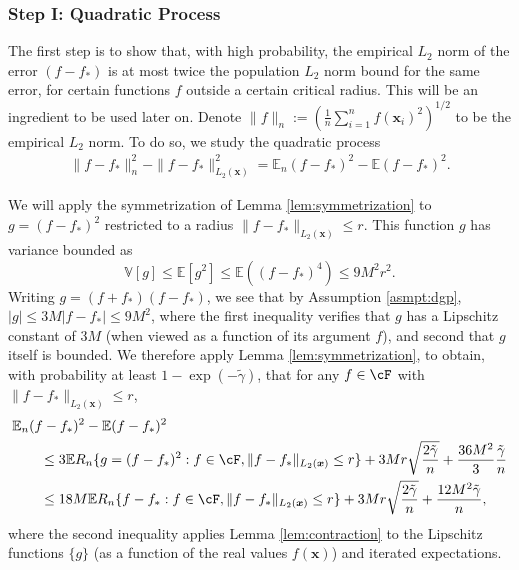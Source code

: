 \documentclass[11pt]{article}
\numberwithin{equation}{section}
\theoremstyle{definition}
\newcommand{\E}{\mathbb{E}}
\newcommand{\V}{\mathbb{V}}
\newcommand{\bx}{\bm{x}}
\newcommand{\gt}{\tilde{\gamma}}
\begin{document}
\begin{appendices}
\subsubsection{Step I: Quadratic Process} 
	\label{appx:quadratic}

The first step is to show that, with high probability, the empirical $L_2$ norm of the error $(f - f_*)$ is at most twice the population $L_2$ norm bound for the same error, for certain functions $f$ outside a certain critical radius. This will be an ingredient to be used later on. Denote $\| f \|_n := \left( \frac{1}{n} \sum_{i=1}^n f(\bx_i)^2 \right)^{1/2}$ to be the empirical $L_2$ norm. To do so, we study the quadratic process
\begin{align*}
	\| f - f_* \|_n^2 - \| f - f_* \|_{L_2(\bx)}^2 = \E_n (f - f_* )^2 - \E (f - f_* )^2.
\end{align*}

We will apply the symmetrization of Lemma \ref{lem:symmetrization} to $g = ( f - f_* )^2$ restricted to a radius $\|f - f_* \|_{L_2(\bx)} \leq r$. This function $g$ has variance bounded as 
\[
	\V[g]  \leq \E[g^2] \leq \E (( f - f_* )^4) \leq 9M^2 r^2.
\]
Writing $g = ( f + f_* ) ( f - f_* )$, we see that by Assumption \ref{asmpt:dgp}, $|g| \leq  3M | f - f_*| \leq 9M^2$, where the first inequality verifies that $g$ has a Lipschitz constant of $3M$ (when viewed as a function of its argument $f$), and second that $g$ itself is bounded. We therefore apply Lemma \ref{lem:symmetrization}, to obtain, with probability at least $1 - \exp(-\gt)$, that for any $f \in \cF$ with $\|f - f_* \|_{L_2(\bx)} \leq r$,
\begin{align}
	& \E_n (f - f_* )^2  - \E (f - f_* )^2    		\nonumber \\
	& \qquad  \leq 3 \E R_n \{ g = ( f - f_* )^2: f \in \cF, \|f - f_* \|_{L_2(\bx)} \leq r \} + 3 M r \sqrt{\frac{2 \gt}{n}} + \frac{36 M^2}{3} \frac{\gt}{n}    		\nonumber \\
	& \qquad  \leq  18 M \E R_n \{ f - f_*: f \in \cF, \|f - f_* \|_{L_2(\bx)} \leq r \} + 3Mr \sqrt{\frac{2 \gt}{n}} + \frac{12 M^2 \gt}{n},      \label{eqn:quad-base}
\end{align}%
where the second inequality applies Lemma \ref{lem:contraction} to the Lipschitz functions $\{g\}$ (as a function of the real values $f(\bx)$) and iterated expectations.



\end{appendices}
\end{document}
